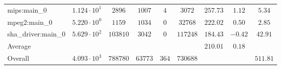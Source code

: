 \begin{tabular}{|l|c|c|c|c|c|c|c|c|}
mips:main\_0            & $ 1.124 \cdot 10^{1}  $ & $ 2896   $ & $ 1007  $ & $ 4   $ & $ 3072   $ & $ 257.73      $ & $ 1.12    $ & $ 5.34    $ \\
mpeg2:main\_0           & $ 5.220 \cdot 10^{0}  $ & $ 1159   $ & $ 1034  $ & $ 0   $ & $ 32768  $ & $ 222.02      $ & $ 0.50    $ & $ 2.85    $ \\
sha\_driver:main\_0     & $ 5.629 \cdot 10^{2}  $ & $ 103810 $ & $ 3042  $ & $ 0   $ & $ 117248 $ & $ 184.43      $ & $ -0.42   $ & $ 42.91   $ \\
\hline
Average                 & $                     $ & $        $ & $       $ & $     $ & $        $ & $ 210.01      $ & $ 0.18    $ & $         $ \\
\hline
Overall                 & $ 4.093 \cdot 10^{3}  $ & $ 788780 $ & $ 63773 $ & $ 364 $ & $ 730688 $ & $             $ & $         $ & $ 511.81  $ \\
\hline
\end{tabular}

